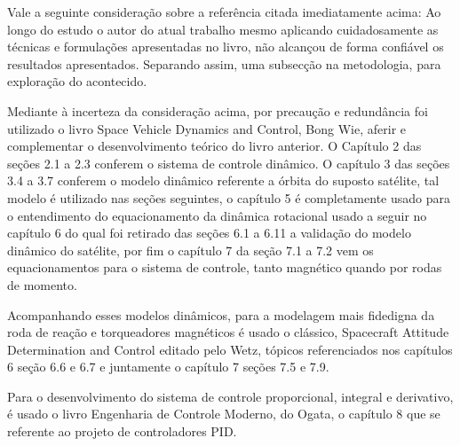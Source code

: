 Vale a seguinte consideração sobre a referência citada imediatamente acima: Ao longo do estudo o autor do atual trabalho mesmo aplicando cuidadosamente as técnicas e formulações apresentadas no livro, não alcançou de forma confiável os resultados apresentados. Separando assim, uma subsecção na metodologia, para exploração do acontecido.  

Mediante à incerteza da consideração acima, por precaução e redundância foi utilizado o livro Space Vehicle Dynamics and Control, Bong Wie, aferir e complementar o desenvolvimento teórico do livro anterior. O Capítulo 2 das seções 2.1 a 2.3 conferem o sistema de controle dinâmico. O capítulo 3 das seções 3.4 a 3.7 conferem o modelo dinâmico referente a órbita do suposto satélite, tal modelo é utilizado nas seções seguintes, o capítulo 5 é completamente usado para o entendimento do equacionamento da dinâmica rotacional usado a seguir no capítulo 6 do qual foi retirado das seções 6.1 a 6.11 a validação do modelo dinâmico do satélite, por fim o capítulo 7 da seção  7.1 a 7.2 vem os equacionamentos para o sistema de controle, tanto magnético quando por rodas de momento.

Acompanhando esses modelos dinâmicos, para a modelagem mais fidedigna da roda de reação e torqueadores magnéticos é usado o clássico, Spacecraft Attitude Determination and Control editado pelo Wetz, tópicos referenciados nos capítulos 6 seção 6.6 e 6.7 e juntamente o  capítulo  7 seções 7.5 e 7.9.

Para o desenvolvimento do sistema de controle proporcional, integral e derivativo, é usado o livro Engenharia de Controle Moderno, do  Ogata, o capítulo 8 que se referente ao projeto de controladores PID.
